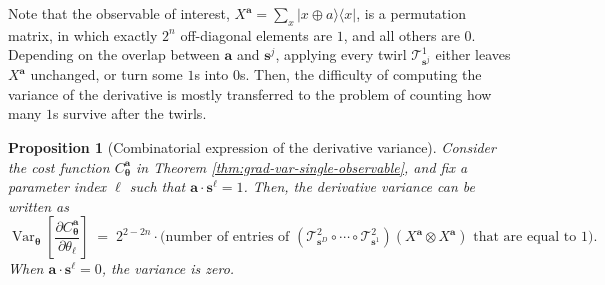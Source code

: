 \documentclass[a4paper,onecolumn,notitlepage,nofootinbib,longbibliography,superscriptaddress, floatfix, pra, aps, 10pt]{revtex4-2}
\newcommand{\vttheta}{{\bm{\theta}}}
\newcommand{\vta}{{\bm{a}}}
\newcommand{\vtsj}{{\bm{s}^j}}
\newcommand{\vts}{{\bm{s}}}
\newtheorem{proposition}{Proposition}
\begin{document}
Note that the observable of interest, $X^\vta = \sum_x \lvert x \oplus a\rangle\langle x\rvert$, is a permutation matrix, in which exactly $2^n$ off-diagonal elements are $1$, and all others are $0$. Depending on the overlap between $\vta$ and $\vtsj$, applying every twirl $\mathcal{T}^1_{\vts^j}$ either leaves $X^\vta$ unchanged, or turn some $1$s into $0$s. Then, the difficulty of computing the variance of the derivative is mostly transferred to the problem of counting how many $1$s survive after the twirls.

\begin{proposition}[Combinatorial expression of the derivative variance]
\label{prop: var_as_combinatorics}
Consider the cost function $C^\vta_\vttheta$ in Theorem \ref{thm:grad-var-single-observable}, and fix a parameter index $\ell$ such that $\vta \cdot \vts^\ell = 1$. 
Then, the derivative variance can be written as
\begin{equation}
    \operatorname{Var}_\vttheta \!\left[\frac{\partial C^\vta_\vttheta}{\partial {\theta_\ell}}\right]
    \;=\; 2^{2-2n} \cdot 
    \bigl(\text{number of entries of $\left(\mathcal{T}^2_{\vts^D}\circ\cdots\circ\mathcal{T}^2_{\vts^1}\right)(X^\vta \otimes X^\vta)$ that are equal to $1$}\bigr).
\end{equation}
When $\vta\cdot\vts^\ell=0$, the variance is zero.
\end{proposition}
\end{document}
